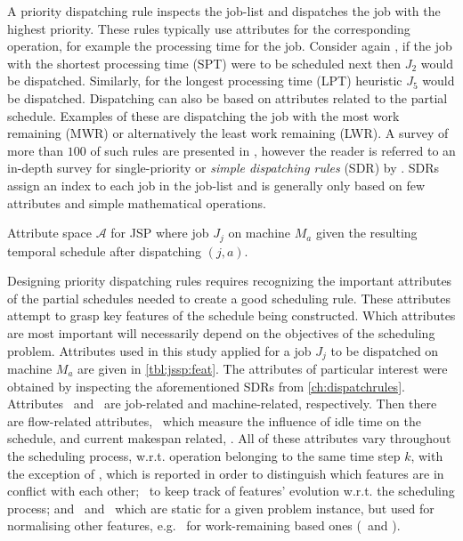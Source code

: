 \documentclass[smallextended]{svjour3}
\begin{document}
A priority dispatching rule inspects the job-list and dispatches the job with 
the highest priority. These rules typically use attributes for the 
corresponding operation, for example the processing time for the job. Consider 
again , if the job with the shortest processing time 
(SPT) were to be scheduled next then $J_2$ would be dispatched. Similarly, for 
the longest processing time (LPT) heuristic $J_5$ would be dispatched. 
Dispatching can also be based on attributes related to the partial schedule. 
Examples of these are dispatching the job with the most work remaining (MWR) or 
alternatively the least work remaining (LWR). A survey of more than $100$ of 
such rules are presented in \citet{Panwalkar77}, however the reader is referred 
to an in-depth survey for single-priority or \emph{simple dispatching rules} 
(SDR) by \citet{Haupt89}.  SDRs assign an index to each job in the job-list and 
is generally only based on few attributes and simple mathematical operations.

\begin{table}[t!] \centering
  \caption[Attribute space $\mathcal{A}$ for JPS]{Attribute space $\mathcal{A}$ 
  for JSP where job $J_j$ on machine $M_a$ given the resulting temporal 
  schedule after dispatching $(j,a)$.
  }
  \label{tbl:jssp:feat}
  
\end{table}

Designing priority dispatching rules requires recognizing the important 
attributes of the partial schedules needed to create a good scheduling rule. 
These attributes attempt to grasp key features of the schedule being 
constructed. Which attributes are most important will necessarily depend on the
objectives of the scheduling problem. Attributes used in this study applied for 
a job $J_j$ to be dispatched on machine $M_a$ are given in \cref{tbl:jssp:feat}.
The attributes of particular interest were obtained by inspecting the 
aforementioned SDRs from \cref{ch:dispatchrules}. Attributes \phiJobRelated\ and
\phiMacRelated\ are job-related and machine-related, respectively. Then there 
are flow-related attributes, \phiFlowRelated\, which measure the influence of 
idle time on the schedule, and current makespan related, \phiScheduleRelated.
All of these attributes vary throughout the scheduling process, w.r.t. 
operation belonging to the same time step $k$, with the exception of \phimac, 
which is reported in order to distinguish which features are in conflict with 
each other;
\phistep\ to keep track of features' evolution w.r.t. the scheduling process; 
and \phitotalProc\ and \phiwrmTotal\ which are static for a given problem 
instance, but used for normalising other features, e.g. \phiwrmTotal\ for 
work-remaining based ones (\phiwrmJob\ and \phiwrmMac).
\end{document}
